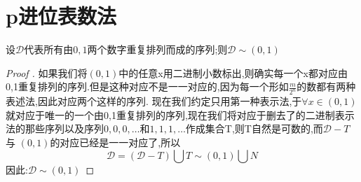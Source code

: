 \section{p进位表数法}
\begin{Theorem}[二进制的等价性]
    设\(\mathscr{D}\)代表所有由\(0,1\)两个数字重复排列而成的序列;则\(\mathscr{D} \sim (0,1)\)
\end{Theorem}
\begin{proof}[Proof ]
    如果我们将\((0,1)\)中的任意x用二进制小数标出,则确实每一个x都对应由0,1重复排列的序列.但是这种对应不是一一对应的,因为每一个形如\(\frac{m}{2^n}\)的数都有两种表述法,因此对应两个这样的序列. 现在我们约定只用第一种表示法,于\(\forall x \in (0,1)\)就对应于唯一的一个由0,1重复排列的序列,现在我们将对应于删去了的二进制表示法的那些序列以及序列\(0,0,0,\dots\)和\(1,1,1,\dots\)作成集合T,则T自然是可数的,而\(\mathscr{D}- T \)与
    \((0,1)\)的对应已经是一一对应了,所以
    \[\mathscr{D} = (\mathscr{D}-T)\bigcup T \sim (0,1)\bigcup N  \]
    因此:\(\mathscr{D} \sim (0,1)\)
\end{proof}
